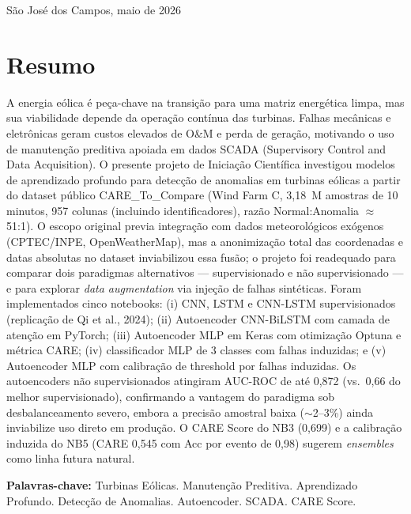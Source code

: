 \documentclass[12pt]{article}
\begin{document}
\begin{center}
São José dos Campos, maio de 2026
\end{center}

\newpage

\section*{Resumo}
\begin{singlespace}
\noindent
A energia eólica é peça-chave na transição para uma matriz energética limpa, mas sua viabilidade depende da operação contínua das turbinas. Falhas mecânicas e eletrônicas geram custos elevados de O\&M e perda de geração, motivando o uso de manutenção preditiva apoiada em dados SCADA (Supervisory Control and Data Acquisition). O presente projeto de Iniciação Científica investigou modelos de aprendizado profundo para detecção de anomalias em turbinas eólicas a partir do dataset público CARE\_To\_Compare (Wind Farm C, 3,18~M amostras de 10 minutos, 957 colunas (incluindo identificadores), razão Normal:Anomalia $\approx$ 51:1). O escopo original previa integração com dados meteorológicos exógenos (CPTEC/INPE, OpenWeatherMap), mas a anonimização total das coordenadas e datas absolutas no dataset inviabilizou essa fusão; o projeto foi readequado para comparar dois paradigmas alternativos --- supervisionado e não supervisionado --- e para explorar \textit{data augmentation} via injeção de falhas sintéticas. Foram implementados cinco notebooks: (i) CNN, LSTM e CNN-LSTM supervisionados (replicação de Qi et al., 2024); (ii) Autoencoder CNN-BiLSTM com camada de atenção em PyTorch; (iii) Autoencoder MLP em Keras com otimização Optuna e métrica CARE; (iv) classificador MLP de 3 classes com falhas induzidas; e (v) Autoencoder MLP com calibração de threshold por falhas induzidas. Os autoencoders não supervisionados atingiram AUC-ROC de até 0,872 (vs.\ 0,66 do melhor supervisionado), confirmando a vantagem do paradigma sob desbalanceamento severo, embora a precisão amostral baixa ($\sim$2--3\%) ainda inviabilize uso direto em produção. O CARE Score do NB3 (0,699) e a calibração induzida do NB5 (CARE 0,545 com Acc por evento de 0,98) sugerem \textit{ensembles} como linha futura natural.
\end{singlespace}

\vspace{0.5cm}
\noindent\textbf{Palavras-chave:} Turbinas Eólicas. Manutenção Preditiva. Aprendizado Profundo. Detecção de Anomalias. Autoencoder. SCADA. CARE Score.
\end{document}

